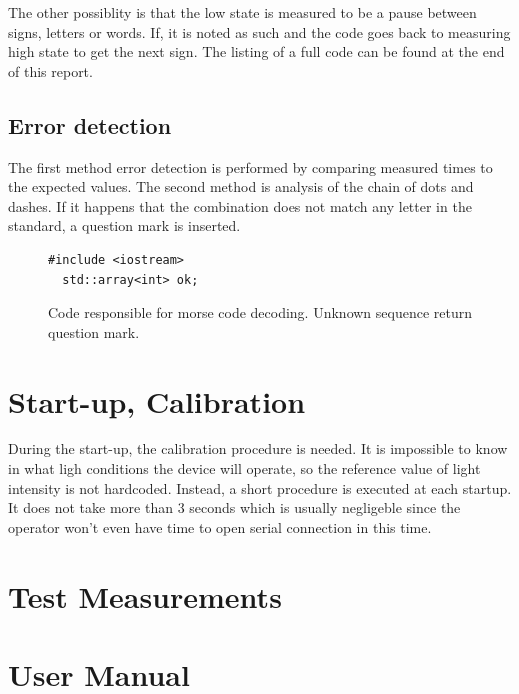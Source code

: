 \documentclass[12pt]{article}
\begin{document}
  The other possiblity is that the low state is measured to be a pause between signs, letters or words. If, it is noted as such and the code goes back to measuring high state to get the next sign.
  The listing of a full code can be found at the end of this report.

  \subsection{Error detection}
  The first method error detection is performed by comparing measured times to the expected values.
  The second method is analysis of the chain of dots and dashes. If it happens that the combination does not match any letter in the standard, a question mark is inserted.
  \begin{figure}
  \begin{lstlisting}[autogobble,style=CStyle]
  #include <iostream>
  std::array<int> ok;
  \end{lstlisting}
    \caption{Code responsible for morse code decoding. Unknown sequence return question mark.}
  \end{figure}
	
	\section{Start-up, Calibration}
  During the start-up, the calibration procedure is needed. It is impossible to know in what ligh conditions the device will operate, so the reference value of light intensity is not hardcoded.
  Instead, a short procedure is executed at each startup. It does not take more than 3 seconds which is usually negligeble since the operator won't even have time to open serial connection in this time.
	
	\section{Test Measurements}
	
	\section{User Manual}
	
\end{document}
